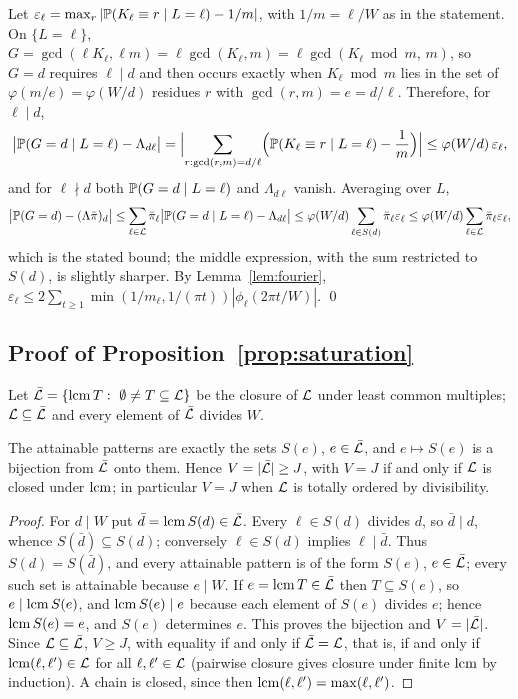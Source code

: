Let $\varepsilon_\ell=\max_r|\mathbb{P}(K_\ell\equiv r\mid L=\ell)-1/m|$, with $1/m=\ell/W$ as in the statement. On $\{L=\ell\}$, $G=\gcd(\ell K_\ell,\ell m)=\ell\gcd(K_\ell,m)=\ell\gcd(K_\ell\bmod m,\,m)$, so $G=d$ requires $\ell\mid d$ and then occurs exactly when $K_\ell\bmod m$ lies in the set of $\varphi(m/e)=\varphi(W/d)$ residues $r$ with $\gcd(r,m)=e=d/\ell$. Therefore, for $\ell\mid d$,
\[
\bigl|\mathbb{P}(G=d\mid L=\ell)-\Lambda_{d\ell}\bigr|
=\Bigl|\sum_{r:\gcd(r,m)=d/\ell}\Bigl(\mathbb{P}(K_\ell\equiv r\mid L=\ell)-\frac1m\Bigr)\Bigr|
\le\varphi(W/d)\,\varepsilon_\ell ,
\]
and for $\ell\nmid d$ both $\mathbb{P}(G=d\mid L=\ell)$ and $\Lambda_{d\ell}$ vanish. Averaging over $L$,
\[
\bigl|\mathbb{P}(G=d)-(\Lambda\bar\pi)_d\bigr|\le\sum_{\ell\in\mathcal{L}}\bar\pi_\ell\bigl|\mathbb{P}(G=d\mid L=\ell)-\Lambda_{d\ell}\bigr|
\le\varphi(W/d)\sum_{\ell\in S(d)}\bar\pi_\ell\varepsilon_\ell
\le\varphi(W/d)\sum_{\ell\in\mathcal{L}}\bar\pi_\ell\varepsilon_\ell ,
\]
which is the stated bound; the middle expression, with the sum restricted to $S(d)$, is slightly sharper. By Lemma~\ref{lem:fourier}, $\varepsilon_\ell\le2\sum_{t\ge1}\min(1/m_\ell,1/(\pi t))|\phi_\ell(2\pi t/W)|$. \qed

\subsection{Proof of Proposition~\ref{prop:saturation}}

Let $\bar{\mathcal{L}}=\{\operatorname{lcm} T:\ \emptyset\ne T\subseteq\mathcal{L}\}$ be the closure of $\mathcal{L}$ under least common multiples; $\mathcal{L}\subseteq\bar{\mathcal{L}}$ and every element of $\bar{\mathcal{L}}$ divides $W$.

\begin{lemma}\label{lem:S-closure}
The attainable patterns are exactly the sets $S(e)$, $e\in\bar{\mathcal{L}}$, and $e\mapsto S(e)$ is a bijection from $\bar{\mathcal{L}}$ onto them. Hence $V=|\bar{\mathcal{L}}|\ge J$, with $V=J$ if and only if $\mathcal{L}$ is closed under $\operatorname{lcm}$; in particular $V=J$ when $\mathcal{L}$ is totally ordered by divisibility.
\end{lemma}

\begin{proof}
For $d\mid W$ put $\bar d=\operatorname{lcm} S(d)\in\bar{\mathcal{L}}$. Every $\ell\in S(d)$ divides $d$, so $\bar d\mid d$, whence $S(\bar d)\subseteq S(d)$; conversely $\ell\in S(d)$ implies $\ell\mid\bar d$. Thus $S(d)=S(\bar d)$, and every attainable pattern is of the form $S(e)$, $e\in\bar{\mathcal{L}}$; every such set is attainable because $e\mid W$. If $e=\operatorname{lcm} T\in\bar{\mathcal{L}}$ then $T\subseteq S(e)$, so $e\mid\operatorname{lcm} S(e)$, and $\operatorname{lcm} S(e)\mid e$ because each element of $S(e)$ divides $e$; hence $\operatorname{lcm} S(e)=e$, and $S(e)$ determines $e$. This proves the bijection and $V=|\bar{\mathcal{L}}|$. Since $\mathcal{L}\subseteq\bar{\mathcal{L}}$, $V\ge J$, with equality if and only if $\bar{\mathcal{L}}=\mathcal{L}$, that is, if and only if $\operatorname{lcm}(\ell,\ell')\in\mathcal{L}$ for all $\ell,\ell'\in\mathcal{L}$ (pairwise closure gives closure under finite $\operatorname{lcm}$ by induction). A chain is closed, since then $\operatorname{lcm}(\ell,\ell')=\max(\ell,\ell')$.
\end{proof}


